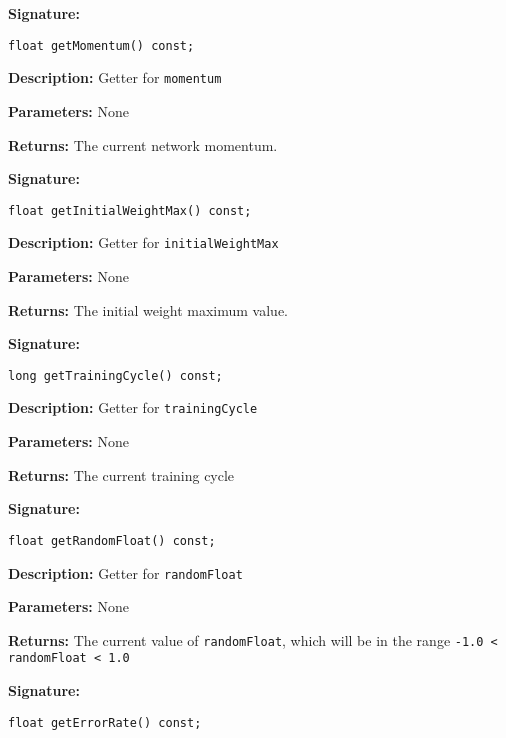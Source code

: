 \documentclass[a4paper]{article}
\begin{document}
\hrulefill %

\textbf{Signature:} \begin{lstlisting}
float getMomentum() const;
\end{lstlisting}

\textbf{Description: }
Getter for \lstinline{momentum}

\textbf{Parameters: } None

\textbf{Returns: }
The current network momentum.

\hrulefill %
\newpage
\hrulefill

\textbf{Signature:} \begin{lstlisting}
float getInitialWeightMax() const;
\end{lstlisting}

\textbf{Description: }
Getter for \lstinline{initialWeightMax}

\textbf{Parameters: } None

\textbf{Returns: }
The initial weight maximum value.

\hrulefill %

\textbf{Signature:} \begin{lstlisting}
long getTrainingCycle() const;
\end{lstlisting}

\textbf{Description: }
Getter for \lstinline{trainingCycle}

\textbf{Parameters: } None

\textbf{Returns: }
The current training cycle

\hrulefill %

\textbf{Signature:} \begin{lstlisting}
float getRandomFloat() const;
\end{lstlisting}

\textbf{Description: }
Getter for \lstinline{randomFloat}

\textbf{Parameters: } None

\textbf{Returns: }
The current value of \lstinline{randomFloat}, which will be in the range \lstinline{-1.0 < randomFloat < 1.0}

\hrulefill %

\textbf{Signature:} \begin{lstlisting}
float getErrorRate() const;
\end{lstlisting}
\end{document}
